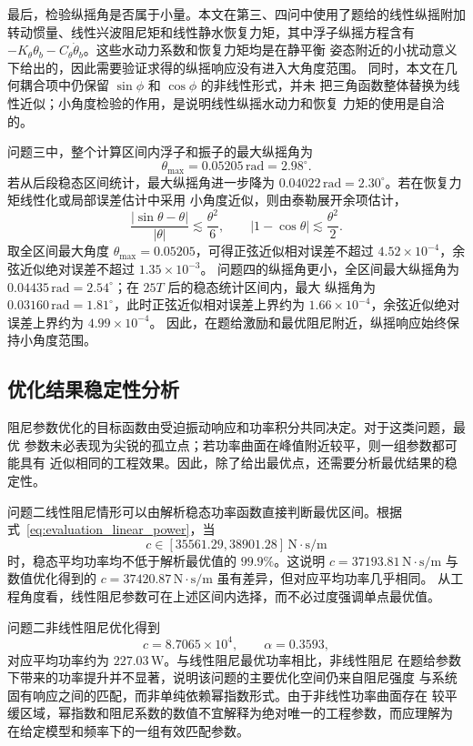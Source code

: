 最后，检验纵摇角是否属于小量。本文在第三、四问中使用了题给的线性纵摇附加
转动惯量、线性兴波阻尼矩和线性静水恢复力矩，其中浮子纵摇方程含有
$-K_\theta\theta_b-C_\theta\dot\theta_b$。这些水动力系数和恢复力矩均是在静平衡
姿态附近的小扰动意义下给出的，因此需要验证求得的纵摇响应没有进入大角度范围。
同时，本文在几何耦合项中仍保留 $\sin\phi$ 和 $\cos\phi$ 的非线性形式，并未
把三角函数整体替换为线性近似；小角度检验的作用，是说明线性纵摇水动力和恢复
力矩的使用是自洽的。

问题三中，整个计算区间内浮子和振子的最大纵摇角为
\[
  \theta_{\max}=0.05205\,\mathrm{rad}=2.98^\circ .
\]
若从后段稳态区间统计，最大纵摇角进一步降为
$0.04022\,\mathrm{rad}=2.30^\circ$。若在恢复力矩线性化或局部误差估计中采用
小角度近似，则由泰勒展开余项估计，
\[
  \frac{|\sin\theta-\theta|}{|\theta|}\lesssim\frac{\theta^2}{6},
  \qquad
  |1-\cos\theta|\lesssim\frac{\theta^2}{2}.
\]
取全区间最大角度 $\theta_{\max}=0.05205$，可得正弦近似相对误差不超过
$4.52\times10^{-4}$，余弦近似绝对误差不超过 $1.35\times10^{-3}$。
问题四的纵摇角更小，全区间最大纵摇角为
$0.04435\,\mathrm{rad}=2.54^\circ$；在 $25T$ 后的稳态统计区间内，最大
纵摇角为 $0.03160\,\mathrm{rad}=1.81^\circ$，此时正弦近似相对误差上界约为
$1.66\times10^{-4}$，余弦近似绝对误差上界约为 $4.99\times10^{-4}$。
因此，在题给激励和最优阻尼附近，纵摇响应始终保持小角度范围。

\subsection{优化结果稳定性分析}

阻尼参数优化的目标函数由受迫振动响应和功率积分共同决定。对于这类问题，最优
参数未必表现为尖锐的孤立点；若功率曲面在峰值附近较平，则一组参数都可能具有
近似相同的工程效果。因此，除了给出最优点，还需要分析最优结果的稳定性。

问题二线性阻尼情形可以由解析稳态功率函数直接判断最优区间。根据
式~\eqref{eq:evaluation_linear_power}，当
\[
  c\in[35561.29,38901.28]\,\mathrm{N\cdot s/m}
\]
时，稳态平均功率均不低于解析最优值的 $99.9\%$。这说明
$c=37193.81\,\mathrm{N\cdot s/m}$ 与数值优化得到的
$c=37420.87\,\mathrm{N\cdot s/m}$ 虽有差异，但对应平均功率几乎相同。
从工程角度看，线性阻尼参数可在上述区间内选择，而不必过度强调单点最优值。

问题二非线性阻尼优化得到
\[
  c=8.7065\times10^4,\qquad \alpha=0.3593,
\]
对应平均功率约为 $227.03\,\mathrm{W}$。与线性阻尼最优功率相比，非线性阻尼
在题给参数下带来的功率提升并不显著，说明该问题的主要优化空间仍来自阻尼强度
与系统固有响应之间的匹配，而非单纯依赖幂指数形式。由于非线性功率曲面存在
较平缓区域，幂指数和阻尼系数的数值不宜解释为绝对唯一的工程参数，而应理解为
在给定模型和频率下的一组有效匹配参数。

